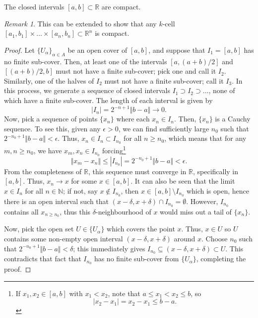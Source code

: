 \documentclass[11pt]{article}
\newcommand{\R}{\mathbb{R}}
\newcommand{\N}{\mathbb{N}}
\newcommand{\norm}[1]{\Vert #1 \Vert}
\theoremstyle{definition}
\theoremstyle{remark}
\newtheorem*{remark}{Remark}
\numberwithin{equation}{section}
\begin{document}
    \begin{theorem}
        The closed intervals $[a, b] \subset \R$ are compact.
        \begin{remark}
            This can be extended to show that any $k$-cell $[a_1, b_1]\times \dots
            \times [a_n, b_n] \subset \R^n$ is compact.
        \end{remark}
    \end{theorem}
    \begin{proof}
        Let $\{U_\alpha\}_{\alpha \in A}$ be an open cover of $[a, b]$, and suppose
        that $I_1 = [a, b]$ has no finite sub-cover. Then, at least one of the
        intervals $[a, (a + b) / 2]$ and $[(a + b)/ 2, b]$ must not have a finite
        sub-cover; pick one and call it $I_2$. Similarly, one of the halves of $I_2$
        must not have a finite sub-cover; call it $I_3$. In this process, we generate
        a sequence of closed intervals $I_1 \supset I_2 \supset \dots$, none of which
        have a finite sub-cover. The length of each interval is given by \[
            |I_n| = 2^{-n + 1}\norm{b - a} \to 0.
        \] Now, pick a sequence of points $\{x_n\}$ where each $x_n \in I_n$. Then,
        $\{x_n\}$ is a Cauchy sequence. To see this, given any $\epsilon > 0$, we can
        find sufficiently large $n_0$ such that $2^{-n_0 + 1}\norm{b - a} <
        \epsilon$. Thus, $x_n \in I_n \subset I_{n_0}$ for all $n \geq n_0$, which
        means that for any $m, n \geq n_0$, we have $x_m, x_n \in I_{n_0}$ forcing\footnote{
            If $x_1, x_2 \in [a, b]$ with $x_1 < x_2$, note that $a \leq x_1 < x_2
            \leq b$, so\[
                |x_2 - x_1| = x_2 - x_1 \leq b - a.
            \] 
        } \[
            \norm{x_m - x_n} \leq |I_{n_0}| = 2^{-n_0 + 1}\norm{b - a} < \epsilon.
        \] From the completeness of $\R$, this sequence must converge in $\R$,
        specifically in $[a, b]$. Thus, $x_n \to x$ for some $x \in [a, b]$. It can
        also be seen that  the limit $x \in I_n$ for all $n \in \N$; if not, say $x
        \notin I_{n_0}$, then $x \in [a, b] \setminus I_{n_0}$ which is open, hence
        there is an open interval such that $(x - \delta, x + \delta) \cap I_{n_0} =
        \emptyset$.  However, $I_{n_0}$ contains all $x_{n \geq n_0}$, thus this
        $\delta$-neighbourhood of $x$ would miss out a tail of $\{x_n\}$.

        Now, pick the open set $U \in \{U_\alpha\}$ which covers the point $x$. Thus,
        $x \in U$ so $U$ contains some non-empty open interval $(x - \delta, x +
        \delta)$ around $x$. Choose $n_0$ such that $2^{-n_0 + 1} \norm{b - a} <
        \delta$; this immediately gives $I_{n_0} \subseteq (x - \delta, x + \delta)
        \subset U$.  This contradicts that fact that $I_{n_0}$ has no finite
        sub-cover from $\{U_\alpha\}$, completing the proof.
    \end{proof}
\end{document}
